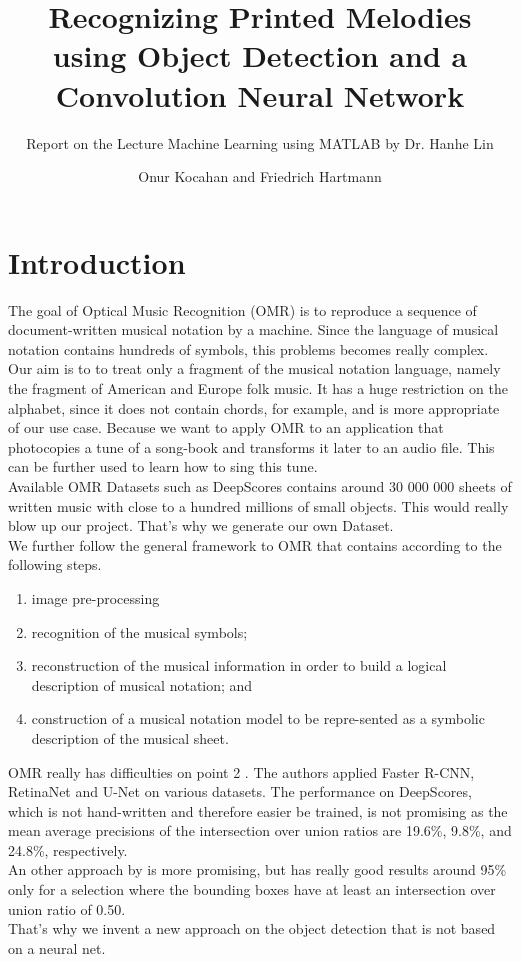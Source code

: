 \documentclass{llncs}
\title{Recognizing Printed Melodies using Object Detection and a Convolution Neural Network}
\subtitle{Report on the Lecture Machine Learning using MATLAB by Dr. Hanhe Lin}
\author{Onur Kocahan and Friedrich Hartmann}
\institute{University of Konstanz}
\begin{document}
 
\maketitle
\section{Introduction}
The goal of Optical Music Recognition (OMR) is to reproduce a sequence of document-written musical notation by a machine. Since the language of musical notation contains hundreds of symbols, this problems becomes really complex. \\
Our aim is to to treat only a fragment of the musical notation language, namely the fragment of American and Europe folk music. It has a huge restriction on the alphabet, since it does not contain chords, for example, and is more appropriate of our use case. Because we want to apply OMR to an application that photocopies a tune of a song-book and transforms it later to an audio file. This can be further used to learn how to sing this tune.  \\
Available OMR Datasets such as DeepScores \citep{DeepScores} contains around 30 000 000 sheets of written music with close to a hundred millions of small objects. This would really blow up our project. That's why we generate our own Dataset. \\
We further follow the general framework to OMR that contains according to \citet{state_of_the_art} the following steps. 
\begin{enumerate}
 \item image pre-processing
 \item recognition of the musical symbols;
 \item reconstruction of the musical information in order to build a logical description of musical notation; and
 \item construction of a musical notation model to be repre-sented as a symbolic description of the musical sheet.
\end{enumerate}
OMR really has difficulties on point 2 \citep{Baseline}. The authors applied Faster R-CNN, RetinaNet and U-Net on various datasets. The performance on DeepScores, which is not hand-written and therefore easier be trained, is not promising as the mean average precisions of the intersection over union ratios are 19.6\%, 9.8\%, and 24.8\%, respectively. \\
An other approach by \citet{GitHub_OMR} is more promising, but has really good results around 95\% only for a selection where the bounding boxes have at least an intersection over union ratio of 0.50. \\
That's why we invent a new approach on the object detection that is not based on a neural net. 
\end{document}
